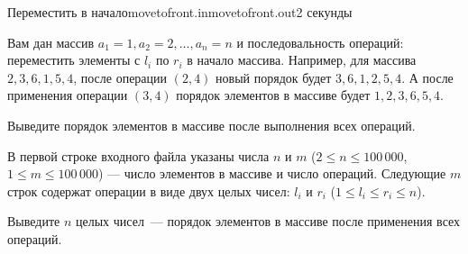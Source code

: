 \begin{problem}{Переместить в начало}{movetofront.in}{movetofront.out}{2 секунды}


Вам дан массив $a_1 = 1, a_2 = 2, \ldots, a_n = n$ и последовальность операций: 
переместить элементы с $l_i$ по $r_i$ в начало массива.
Например, для массива $2, 3, 6, 1, 5, 4$, после операции
$(2, 4)$ новый порядок будет $3, 6, 1, 2, 5, 4$.
А после применения операции $(3, 4)$ порядок элементов в массиве будет $1, 2, 3, 6, 5, 4$.

Выведите порядок элементов в массиве после выполнения всех операций.

\InputFile
В первой строке входного файла указаны числа $n$ и $m$
($2 \le n \le 100\,000$, $1 \le m \le 100\,000$) --- число элементов в массиве и число операций.
Следующие $m$ строк содержат операции в виде двух целых чисел:
$l_i$ и $r_i$ ($1 \le l_i \le r_i \le n$).


\OutputFile
Выведите $n$ целых чисел~--- порядок элементов в массиве после применения всех операций.

\Example

\begin{example}
%
\end{example}

\end{problem}

